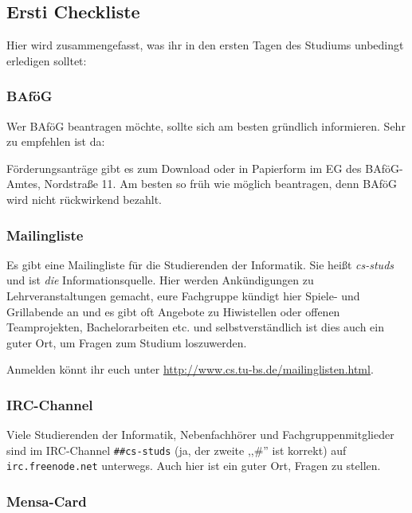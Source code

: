 \subsection{Ersti Checkliste}

Hier wird zusammengefasst, was ihr in den ersten Tagen des Studiums
unbedingt erledigen solltet:

\subsubsection{BAf\"oG}

Wer BAf\"oG beantragen m\"ochte, sollte sich am besten gr\"undlich
informieren. Sehr zu empfehlen ist da: \\
\mbox{}
 
F\"orderungsantr\"age gibt es zum Download oder in Papierform im
EG des BAf\"oG-Amtes, Nordstra\ss e 11. Am besten so fr\"uh
wie m\"oglich beantragen, denn BAf\"oG wird nicht r\"uckwirkend
bezahlt.

\subsubsection{Mailingliste}

Es gibt eine Mailingliste f\"ur die Studierenden der Informatik.
Sie heißt \emph{cs-studs} und ist \emph{die} Informationsquelle.
Hier werden Ank\"undigungen zu Lehrveranstaltungen gemacht, eure
Fachgruppe k\"undigt hier Spiele- und Grillabende an und es gibt
oft Angebote zu Hiwistellen oder offenen Teamprojekten,
Bachelorarbeiten etc. und selbstverst\"andlich ist dies auch ein
guter Ort, um Fragen zum Studium loszuwerden.

Anmelden k\"onnt ihr euch unter
\url{http://www.cs.tu-bs.de/mailinglisten.html}.

\subsubsection{IRC-Channel}

Viele Studierenden der Informatik, Nebenfachh\"orer und
Fachgruppenmitglieder sind im IRC-Channel \texttt{\#\#cs-studs}
(ja, der zweite ,,\#'' ist korrekt) auf \texttt{irc.freenode.net}
unterwegs. Auch hier ist ein guter Ort, Fragen zu stellen.

\subsubsection{Mensa-Card}

